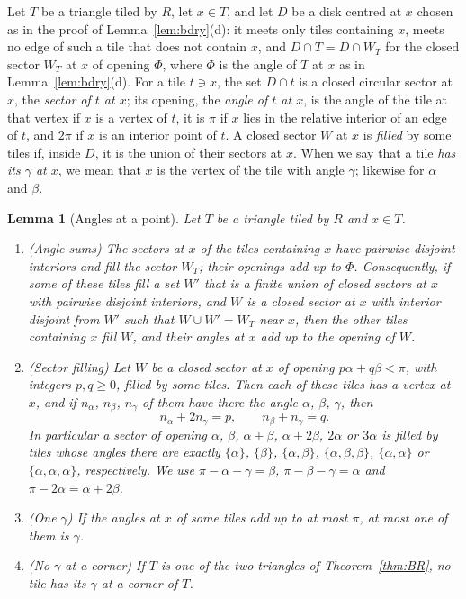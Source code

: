 \documentclass[11pt]{amsart}
\newtheorem{lemma}[theorem]{Lemma}
\theoremstyle{remark}
\begin{document}
Let $T$ be a triangle tiled by $R$, let $x\in T$, and let $D$ be a disk centred at $x$ chosen as in the proof of Lemma~\ref{lem:bdry}(d): it meets only tiles containing $x$, meets no edge of such a tile that does not contain $x$, and $D\cap T=D\cap W_T$ for the closed sector $W_T$ at $x$ of opening $\Phi$, where $\Phi$ is the angle of $T$ at $x$ as in Lemma~\ref{lem:bdry}(d). For a tile $t\ni x$, the set $D\cap t$ is a closed circular sector at $x$, the \emph{sector of $t$ at $x$}; its opening, the \emph{angle of $t$ at $x$}, is the angle of the tile at that vertex if $x$ is a vertex of $t$, it is $\pi$ if $x$ lies in the relative interior of an edge of $t$, and $2\pi$ if $x$ is an interior point of $t$. A closed sector $W$ at $x$ is \emph{filled} by some tiles if, inside $D$, it is the union of their sectors at $x$. When we say that a tile \emph{has its $\gamma$ at $x$}, we mean that $x$ is the vertex of the tile with angle $\gamma$; likewise for $\alpha$ and $\beta$.

\begin{lemma}[Angles at a point]\label{app:angles}
Let $T$ be a triangle tiled by $R$ and $x\in T$.
\begin{enumerate}
\item[(a)] \textup{(Angle sums)} The sectors at $x$ of the tiles containing $x$ have pairwise disjoint interiors and fill the sector $W_T$; their openings add up to $\Phi$. Consequently, if some of these tiles fill a set $W'$ that is a finite union of closed sectors at $x$ with pairwise disjoint interiors, and $W$ is a closed sector at $x$ with interior disjoint from $W'$ such that $W\cup W'=W_T$ near $x$, then the other tiles containing $x$ fill $W$, and their angles at $x$ add up to the opening of $W$.
\item[(b)] \textup{(Sector filling)} Let $W$ be a closed sector at $x$ of opening $p\alpha+q\beta<\pi$, with integers $p,q\ge0$, filled by some tiles. Then each of these tiles has a vertex at $x$, and if $n_\alpha$, $n_\beta$, $n_\gamma$ of them have there the angle $\alpha$, $\beta$, $\gamma$, then
\[
n_\alpha+2n_\gamma=p,\qquad n_\beta+n_\gamma=q .
\]
In particular a sector of opening $\alpha$, $\beta$, $\alpha+\beta$, $\alpha+2\beta$, $2\alpha$ or $3\alpha$ is filled by tiles whose angles there are exactly $\{\alpha\}$, $\{\beta\}$, $\{\alpha,\beta\}$, $\{\alpha,\beta,\beta\}$, $\{\alpha,\alpha\}$ or $\{\alpha,\alpha,\alpha\}$, respectively. We use $\pi-\alpha-\gamma=\beta$, $\pi-\beta-\gamma=\alpha$ and $\pi-2\alpha=\alpha+2\beta$.
\item[(c)] \textup{(One $\gamma$)} If the angles at $x$ of some tiles add up to at most $\pi$, at most one of them is $\gamma$.
\item[(d)] \textup{(No $\gamma$ at a corner)} If $T$ is one of the two triangles of Theorem~\ref{thm:BR}, no tile has its $\gamma$ at a corner of $T$.
\end{enumerate}
\end{lemma}
\end{document}
